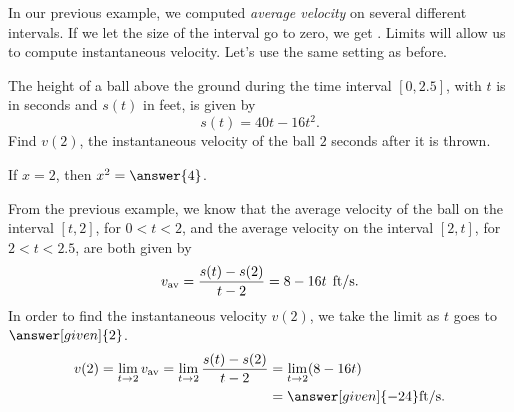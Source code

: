 \documentclass{ximera}
\begin{document}
In our previous example, we computed \textit{average velocity} on
several different intervals. If we let the size of the interval go to
zero, we get . Limits will allow us to
compute instantaneous velocity.  Let's use the same setting as before.

\begin{example}
The height of a ball above the ground during the time interval  $[0,2.5]$, with $t$ is in seconds and $s(t)$ in feet, 
is given by
\[
s(t) = 40t - 16t^2.
\] 
Find $v(2)$, the instantaneous velocity of the ball $2$ seconds after it
is thrown.

If $ x=2 $, then  $ x^2=\answer{4} $.
\begin{explanation}
From the previous example, we know that the average velocity of the
ball on the interval $[t,2]$, for $0<t<2$, and the average velocity
on the interval $[2,t]$, for $2<t<2.5$, are both given by
\[
v_{\text{av}} =  \frac{s(t)-s(2)}{t-2}= 8-16t \hspace{0.06in}\text{ft/s}.
\]
In order to find the instantaneous velocity $v(2)$, we 
take the limit as $t$ goes to $\answer[given]{2}$. 
\begin{align*}
v (2)= \lim_{t\to2}v_{\text{av}}
=\lim_{t\to2}  \frac{s(t)-s(2)}{t-2}
&= \lim_{t\to2}(8-16t)\\
&= \answer[given]{-24}\text{ft/s}.
\end{align*}
\end{explanation}
\end{example}
\end{document}
